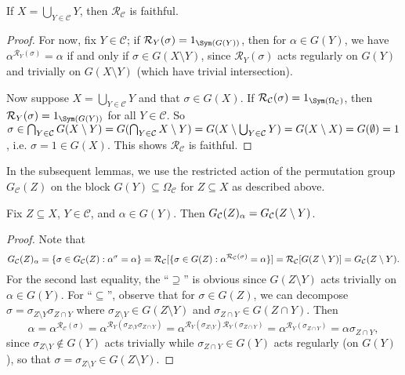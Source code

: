 \begin{lemma}\label{lem:blaha_elem_cover_faithful}
    If $X = \bigcup_{Y \in \mathcal{C}} Y$, then $\mathcal{R}_\mathcal{C}$ is faithful.
\end{lemma}

\begin{proof}
    For now, fix $Y \in \mathcal{C}$; if $\mathcal{R}_Y(\sigma) = 1_{\Sym(G(Y))}$, then for $\alpha \in G(Y)$, we have $\alpha^{\mathcal{R}_Y(\sigma)} = \alpha$ if and only if $\sigma \in G(X \setminus Y)$, since $\mathcal{R}_Y(\sigma)$ acts regularly on $G(Y)$ and trivially on $G(X \setminus Y)$ (which have trivial intersection).

    Now suppose $X = \bigcup_{Y \in \mathcal{C}} Y$ and that $\sigma \in G(X)$. If $\mathcal{R}_\mathcal{C}(\sigma) = 1_{\Sym(\Omega_\mathcal{C})}$, then $\mathcal{R}_Y(\sigma) = 1_{\Sym(G(Y))}$ for all $Y \in \mathcal{C}$. So $\sigma \in \bigcap_{Y \in \mathcal{C}} G(X \setminus Y) = \added{3}{G(\bigcap_{Y \in \mathcal{C}} X \setminus Y)} = G(X \setminus \bigcup_{Y \in \mathcal{C}} Y) = G(X \setminus X) = G(\emptyset) = 1$, i.e. $\sigma = 1 \in G(X)$. This shows $\mathcal{R}_\mathcal{C}$ is faithful.
\end{proof}

In the subsequent lemmas, we use the restricted action of the permutation group $G_\mathcal{C}(Z)$ on the block $G(Y) \subseteq \Omega_\mathcal{C}$ for $Z \subseteq X$ as described above. 

\begin{lemma}\label{lem:blaha_elem_stabiliser}
    Fix $Z \subseteq X$,  $Y \in \mathcal{C}$, and $\alpha \in G(Y)$. Then $\added{2}{G_\mathcal{C}(Z)_\alpha} = G_\mathcal{C}(Z \setminus Y)$.
\end{lemma}

\begin{proof}
    Note that
    $$\added{2}{G_\mathcal{C}(Z)_\alpha} = \{\sigma \in G_\mathcal{C}(Z) : \alpha^\sigma = \alpha\} = \mathcal{R}_\mathcal{C}[\{\sigma \in G(Z) : \alpha^{\mathcal{R}_\mathcal{C}(\sigma)} = \alpha\}] = \mathcal{R}_\mathcal{C}[G(Z \setminus Y)] = G_\mathcal{C}(Z \setminus Y).$$
    For the second last equality, the ``$\supseteq$'' is obvious since $G(Z \setminus Y)$ acts trivially on $\alpha \in G(Y)$. For ``$\subseteq$'', observe that for $\sigma \in G(Z)$, we can decompose $\sigma = \sigma_{Z \setminus Y} \sigma_{Z \cap Y}$ where $\sigma_{Z \setminus Y} \in G(Z \setminus Y)$ and $\sigma_{Z \cap Y} \in G(Z \cap Y)$. Then
    $$\alpha = \alpha^{\mathcal{R}_\mathcal{C}(\sigma)} = \alpha^{\mathcal{R}_Y(\sigma_{Z \setminus Y} \sigma_{Z \cap Y})} = \alpha^{\mathcal{R}_Y(\sigma_{Z \setminus Y})\mathcal{R}_Y(\sigma_{Z \cap Y})} = \alpha^{\mathcal{R}_Y(\sigma_{Z \cap Y})} = \alpha\sigma_{Z \cap Y},$$
     since $\sigma_{Z \setminus Y} \not\in G(Y)$ acts trivially while $\sigma_{Z \cap Y} \in G(Y)$ acts regularly (on $G(Y)$), so that $\sigma = \sigma_{Z \setminus Y} \in G(Z \setminus Y)$.
\end{proof}

